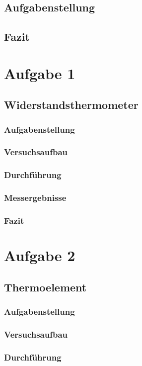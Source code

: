 \documentclass[a4paper,11pt,oneside]{article}
\begin{document}
\subsection{Aufgabenstellung}
\subsection{Fazit}

\section{Aufgabe 1}
\subsection{Widerstandsthermometer}
\subsubsection{Aufgabenstellung}
\subsubsection{Versuchsaufbau}
\subsubsection{Durchführung}
\subsubsection{Messergebnisse}
\subsubsection{Fazit}

\section{Aufgabe 2}
\subsection{Thermoelement}
\subsubsection{Aufgabenstellung}
\subsubsection{Versuchsaufbau}
\subsubsection{Durchführung}
\end{document}
